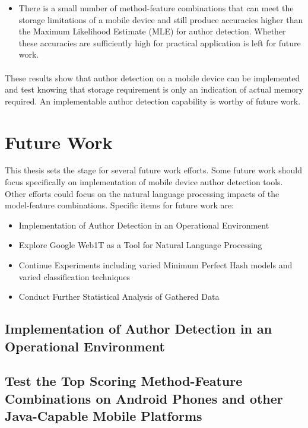 \begin{itemize}
	\item There is a small number of method-feature combinations that can meet the storage limitations of a mobile device and still produce accuracies higher than the Maximum Likelihood Estimate (MLE) for author detection.  Whether these accuracies are sufficiently high for practical application is left for future work.
\end{itemize}
	
	\paragraph*{} These results show that author detection on a mobile device can be implemented and test knowing that storage requirement is only an indication of actual memory required.  An implementable author detection capability is worthy of future work.

\section{Future Work}

This thesis sets the stage for several future work efforts.  Some future work should focus specifically on implementation of mobile device author detection tools.  Other efforts could focus on the natural language processing impacts of the model-feature combinations. Specific items for future work are:
\begin{itemize}
	\item Implementation of Author Detection in an Operational Environment
	\item Explore Google Web1T as a Tool for Natural Language Processing
	\item Continue Experiments including varied Minimum Perfect Hash models and varied classification techniques
	\item Conduct Further Statistical Analysis of Gathered Data
\end{itemize}

\begin{singlespace}
\section{Implementation of Author Detection in an Operational Environment}
\end{singlespace}

	\begin{singlespace}
	\subsection{Test the Top Scoring Method-Feature Combinations on Android Phones and other Java-Capable Mobile Platforms}
	\end{singlespace}
